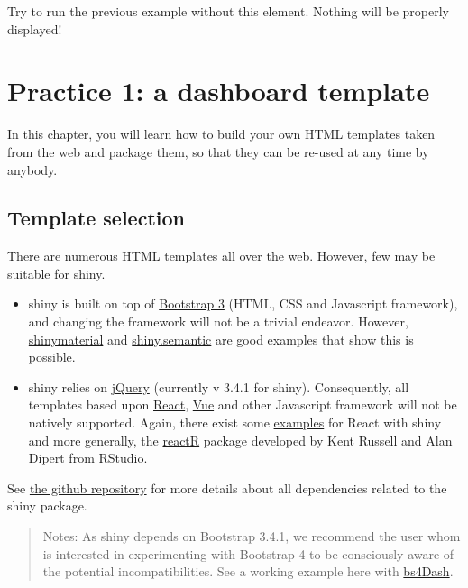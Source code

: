 \documentclass[
]{book}
\providecommand{\tightlist}{%
  \setlength{\itemsep}{0pt}\setlength{\parskip}{0pt}}
\begin{document}
Try to run the previous example without this element. Nothing will be properly displayed!

\hypertarget{part-practice-1-a-dashboard-template}{%
\part*{Practice 1: a dashboard template}\label{part-practice-1-a-dashboard-template}}

In this chapter, you will learn how to build your own HTML templates taken from the web and package them, so that they can be re-used at any time by anybody.

\hypertarget{custom-templates-selection}{%
\chapter{Template selection}\label{custom-templates-selection}}

There are numerous HTML templates all over the web. However, few may be suitable for shiny.

\begin{itemize}
\tightlist
\item
  shiny is built on top of \href{https://getbootstrap.com/docs/3.3/}{Bootstrap 3} (HTML, CSS and Javascript framework), and changing the framework will not be a trivial endeavor. However, \href{https://github.com/ericrayanderson/shinymaterial}{shinymaterial} and \href{https://github.com/Appsilon/shiny.semantic}{shiny.semantic} are good examples that show this is possible.
\item
  shiny relies on \href{https://jquery.com}{jQuery} (currently v 3.4.1 for shiny). Consequently, all templates based upon \href{https://fr.reactjs.org}{React}, \href{https://vuejs.org}{Vue} and other Javascript framework will not be natively supported. Again, there exist some \href{https://github.com/alandipert/react-widget-demo/blob/master/app.R}{examples} for React with shiny and more generally,
  the \href{https://react-r.github.io/reactR/}{reactR} package developed by Kent Russell and Alan Dipert from RStudio.
\end{itemize}

See \href{https://github.com/rstudio/shiny/tree/master/inst/www/shared}{the github repository} for more details about all dependencies related to the shiny package.

\begin{quote}
Notes: As shiny depends on Bootstrap 3.4.1, we recommend the user whom is interested in experimenting with Bootstrap 4 to be consciously aware of the potential incompatibilities. See a working example here with \href{https://github.com/RinteRface/bs4Dash}{bs4Dash}.
\end{quote}
\end{document}
